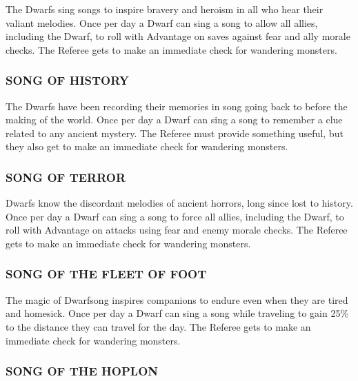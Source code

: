 \documentclass[twoside]{article}
\begin{document}
The Dwarfs sing songs to inspire bravery and heroism in all who hear their valiant melodies. Once per day a Dwarf can sing a song to allow all allies, including the Dwarf, to roll with Advantage on saves against fear and ally morale checks. The Referee gets to make an immediate check for wandering monsters.

\subsubsection*{\footnotesize{S}\scriptsize{ONG OF} \footnotesize{H}\scriptsize{ISTORY}\normalsize}

The Dwarfs have been recording their memories in song going back to before the making of the world. Once per day a Dwarf can sing a song to remember a clue related to any ancient mystery. The Referee must provide something useful, but they also get to make an immediate check for wandering monsters.

\subsubsection*{\footnotesize{S}\scriptsize{ONG OF} \footnotesize{T}\scriptsize{ERROR}\normalsize}

Dwarfs know the discordant melodies of ancient horrors, long since lost to history. Once per day a Dwarf can sing a song to force all allies, including the Dwarf, to roll with Advantage on attacks using fear and enemy morale checks. The Referee gets to make an immediate check for wandering monsters.

\subsubsection*{\footnotesize{S}\scriptsize{ONG OF THE} \footnotesize{F}\scriptsize{LEET OF} \footnotesize{F}\scriptsize{OOT}\normalsize}

The magic of Dwarfsong inspires companions to endure even when they are tired and homesick. Once per day a Dwarf can sing a song while traveling to gain 25\% to the distance they can travel for the day. The Referee gets to make an immediate check for wandering monsters.

\subsubsection*{\footnotesize{S}\scriptsize{ONG OF THE} \footnotesize{H}\scriptsize{OPLON}\normalsize}
\end{document}
